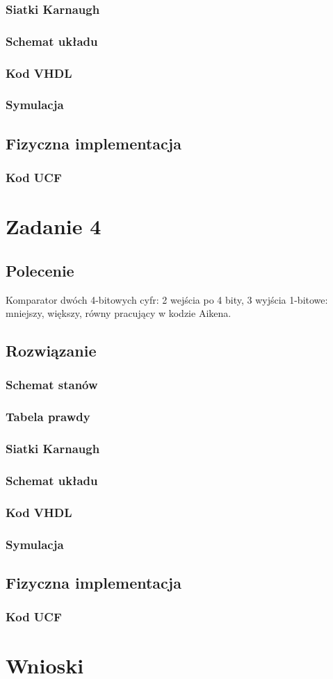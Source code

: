 \documentclass[a4paper,12pt]{extarticle}  %
\begin{document}
\subsubsection{Siatki Karnaugh}
\subsubsection{Schemat układu}
\subsubsection{Kod VHDL}
\subsubsection{Symulacja}
\subsection{Fizyczna implementacja}
\subsubsection{Kod UCF}

\section{Zadanie 4}
\subsection{Polecenie}
Komparator dwóch 4-bitowych cyfr: 2 wejścia po 4 bity, 3 wyjścia 1-bitowe: 
mniejszy, większy, równy pracujący w kodzie Aikena.
\subsection{Rozwiązanie}
\subsubsection{Schemat stanów}
\subsubsection{Tabela prawdy}
\subsubsection{Siatki Karnaugh}
\subsubsection{Schemat układu}
\subsubsection{Kod VHDL}
\subsubsection{Symulacja}
\subsection{Fizyczna implementacja}
\subsubsection{Kod UCF}

\section{Wnioski}
\end{document}
